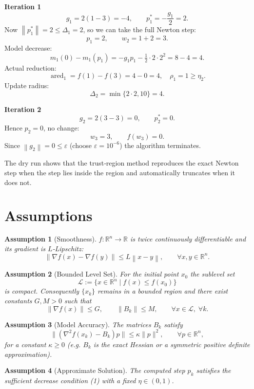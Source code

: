 \documentclass{article}
\newtheorem{assumption}{Assumption}
\newcommand{\norm}[1]{\left\lVert #1\right\rVert}
\newcommand{\R}{\mathbb{R}}
\begin{document}
\medskip
\noindent\textbf{Iteration 1}
\[
g_{1}=2(1-3)=-4,\qquad p_{1}^{*}= -\frac{g_{1}}{2}=2.
\]
Now $\norm{p_{1}^{*}}=2\le\Delta_{1}=2$, so we can take the full Newton step:
\[
p_{1}=2,\qquad w_{2}=1+2=3.
\]
Model decrease:
\[
m_{1}(0)-m_{1}(p_{1}) = -g_{1}p_{1}-\tfrac12\cdot2\cdot2^{2}=8-4=4.
\]
Actual reduction:
\[
\operatorname{ared}_{1}=f(1)-f(3)=4-0=4,\quad\rho_{1}=1\ge\eta_{2}.
\]
Update radius:
\[
\Delta_{2}= \min\{2\cdot2,10\}=4.
\]

\medskip
\noindent\textbf{Iteration 2}
\[
g_{2}=2(3-3)=0,\qquad p_{2}^{*}=0.
\]
Hence $p_{2}=0$, no change:
\[
w_{3}=3,\qquad f(w_{3})=0.
\]
Since $\norm{g_{2}}=0\le\varepsilon$ (choose $\varepsilon=10^{-6}$) the algorithm terminates.

The dry run shows that the trust‑region method reproduces the exact Newton step when the step lies inside the region and automatically truncates when it does not.

\newpage
\section*{Assumptions}
\begin{assumption}[Smoothness]\label{A:smooth}
$f:\R^{n}\rightarrow\R$ is twice continuously differentiable and its gradient is $L$‑Lipschitz:
\[
\norm{\nabla f(x)-\nabla f(y)}\le L\norm{x-y},\qquad\forall x,y\in\R^{n}.
\]
\end{assumption}
\begin{assumption}[Bounded Level Set]\label{A:level}
For the initial point $x_{0}$ the sublevel set 
\[
\mathcal{L}:=\{x\in\R^{n}\mid f(x)\le f(x_{0})\}
\]
is compact. Consequently $\{x_{k}\}$ remains in a bounded region and there exist constants $G,M>0$ such that
\[
\norm{\nabla f(x)}\le G,\qquad \norm{B_{k}}\le M,\qquad\forall x\in\mathcal{L},\; \forall k.
\]
\end{assumption}
\begin{assumption}[Model Accuracy]\label{A:model}
The matrices $B_{k}$ satisfy
\[
\bigl\|(\nabla^{2}f(x_{k})-B_{k})p\bigr\|\le \kappa\|p\|^{2},\qquad\forall p\in\R^{n},
\]
for a constant $\kappa\ge0$ (e.g. $B_{k}$ is the exact Hessian or a symmetric positive definite approximation).
\end{assumption}
\begin{assumption}[Approximate Solution]\label{A:approx}
The computed step $p_{k}$ satisfies the sufficient decrease condition (1) with a fixed $\eta\in(0,1)$.
\end{assumption}
\end{document}
